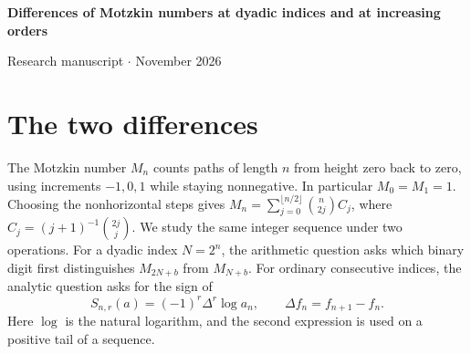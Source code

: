 \documentclass[11pt,a4paper]{article}
\begin{document}
\begin{center}
{\LARGE\bfseries\color{ink} Differences of Motzkin numbers at dyadic indices and at increasing orders\par}
\vspace{10pt}
{\normalsize Research manuscript \enspace$\cdot$ November 2026\par}
\end{center}
\begin{abstract}
We prove Conjectures 5.2 and 5.3 of Lengyel (2013) on the binary orders
of differences of Motzkin numbers at shifted dyadic indices. For the paired
shifts $2^q$ and $2^q+1$ we determine their common order and
the sharp onset of the formula. Conjecture 5.1 as stated is false. At shift
$195$ its proposed upper bound fails for every odd $n\ge13$.
A generating function for derivatives of the shift recurrence controls the
loss of powers of two and identifies cancellation at the first surviving digit.
For the ordinary
real logarithm we determine the eventual sign of every order of forward
difference at each sufficiently large index. At even indices all signed
differences of order at least two are positive. At odd indices their first
failure occurs at $n/2-(\log n)/(2\log4)+O(1)$. The proof compares two
endpoint contributions and bounds the inverse Laplace transform of the logarithm.
The same endpoint estimate gives simultaneous positivity up to order $c n$ for
all five sequences in Chen, Guo and Wang's almost-infinite log-monotonicity
conjecture. We distinguish the fixed-order consequence accessible from prior
criteria from the growing-order statements.
\end{abstract}
\section{The two differences}
The Motzkin number $M_n$ counts paths of length $n$ from height zero back to
zero, using increments $-1,0,1$ while staying nonnegative. In particular
$M_0=M_1=1$. Choosing the nonhorizontal steps gives
$M_n=\sum_{j=0}^{\lfloor n/2\rfloor}\binom{n}{2j}C_j$, where
$C_j=(j+1)^{-1}\binom{2j}{j}$. We study the same integer sequence under
two operations. For a dyadic index $N=2^n$, the arithmetic question asks
which binary digit first distinguishes $M_{2N+b}$ from $M_{N+b}$.
For ordinary consecutive indices, the analytic question asks for the sign of
\[
 S_{n,r}(a)=(-1)^r\Delta^r\log a_n,\qquad \Delta f_n=f_{n+1}-f_n.
\]
Here $\log$ is the natural logarithm, and the second expression is used on a
positive tail of a sequence.
 
\end{document}
